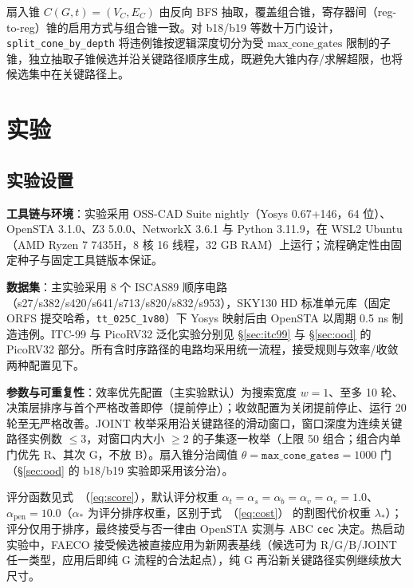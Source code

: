 \documentclass[journal]{IEEEtran}
\renewcommand{\eqref}[1]{\textup{（\ref{#1}）}}
\begin{document}
扇入锥 $C(G, t) = (V_C, E_C)$ 由反向 BFS 抽取，覆盖组合锥，寄存器间（reg-to-reg）锥的启用方式与组合锥一致。对 b18/b19 等数十万门设计，\texttt{split\_cone\_by\_depth} 将违例锥按逻辑深度切分为受 $\mathrm{max\_cone\_gates}$ 限制的子锥，独立抽取子锥候选并沿关键路径顺序生成，既避免大锥内存/求解超限，也将候选集中在关键路径上。

\section{实验}\label{sec:exp}

\subsection{实验设置}\label{sec:setup}

\textbf{工具链与环境}：实验采用 OSS-CAD Suite nightly（Yosys 0.67+146，64 位）、OpenSTA 3.1.0、Z3 5.0.0、NetworkX 3.6.1 与 Python 3.11.9，在 WSL2 Ubuntu（AMD Ryzen 7 7435H，8 核 16 线程，32 GB RAM）上运行；流程确定性由固定种子与固定工具链版本保证。

\textbf{数据集}：主实验采用 8 个 ISCAS89 顺序电路（s27/s382/s420/s641/s713/s820/s832/s953），SKY130 HD 标准单元库（固定 ORFS 提交哈希，\texttt{tt\_025C\_1v80}）下 Yosys 映射后由 OpenSTA 以周期 0.5 ns 制造违例。ITC-99 与 PicoRV32 泛化实验分别见 \S\ref{sec:itc99} 与 \S\ref{sec:ood} 的 PicoRV32 部分。所有含时序路径的电路均采用统一流程，接受规则与效率/收敛两种配置见下。

\textbf{参数与可重复性}：效率优先配置（主实验默认）为搜索宽度 $w=1$、至多 10 轮、决策层排序与首个严格改善即停（提前停止）；收敛配置为关闭提前停止、运行 20 轮至无严格改善。JOINT 枚举采用沿关键路径的滑动窗口，窗口深度为连续关键路径实例数 $\le 3$，对窗口内大小 $\ge 2$ 的子集逐一枚举（上限 50 组合；组合内单门优先 R、其次 G，不放 B）。扇入锥分治阈值 $\theta = \texttt{max\_cone\_gates} = 1000$ 门（\S\ref{sec:ood} 的 b18/b19 实验即采用该分治）。

评分函数见式~\eqref{eq:score}，默认评分权重 $\alpha_t=\alpha_s=\alpha_b=\alpha_v=\alpha_e=1.0$、$\alpha_{\mathrm{pen}}=10.0$（$\alpha_*$ 为评分排序权重，区别于式~\eqref{eq:cost} 的割图代价权重 $\lambda_*$）；评分仅用于排序，最终接受与否一律由 OpenSTA 实测与 ABC \texttt{cec} 决定。热启动实验中，FAECO 接受候选被直接应用为新网表基线（候选可为 R/G/B/JOINT 任一类型，应用后即纯 G 流程的合法起点），纯 G 再沿新关键路径实例继续放大尺寸。
\end{document}
